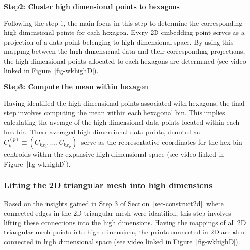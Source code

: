\documentclass[
  12pt]{article}
\begin{document}
\textbf{Step2: Cluster high dimensional points to hexagons}

Following the step 1, the main focus in this step to determine the
corresponding high dimensional points for each hexagon. Every 2D
embedding point serves as a projection of a data point belonging to high
dimensional space. By using this mapping between the high dimensional
data and their corresponding projections, the high dimensional points
allocated to each hexagons are determined (see video linked in
Figure~\ref{fig-wkhighD}).

\textbf{Step3: Compute the mean within hexagon}

Having identified the high-dimensional points associated with hexagons,
the final step involves computing the mean within each hexagonal bin.
This implies calculating the average of the high-dimensional data points
located within each hex bin. These averaged high-dimensional data
points, denoted as \(C_k^{(p)} \equiv (C_{kx_1}, ..., C_{kx_p})\), serve
as the representative coordinates for the hex bin centroids within the
expansive high-dimensional space (see video linked in
Figure~\ref{fig-wkhighD}).

\hypertarget{lifting-the-2d-triangular-mesh-into-high-dimensions}{%
\subsubsection{Lifting the 2D triangular mesh into high
dimensions}\label{lifting-the-2d-triangular-mesh-into-high-dimensions}}

Based on the insights gained in Step 3 of Section~\ref{sec-construct2d},
where connected edges in the 2D triangular mesh were identified, this
step involves lifting these connections into the high dimensions. Having
the mappings of all 2D triangular mesh points into high dimensions, the
points connected in 2D are also connected in high dimensional space (see
video linked in Figure~\ref{fig-wkhighD}).
\end{document}
